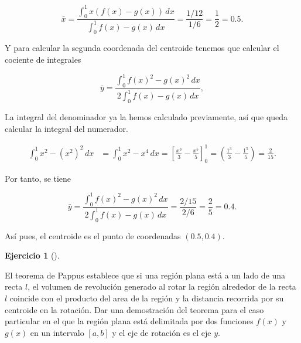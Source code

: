 \documentclass[
  spanish,
  a4paper,
]{scrreport}
\theoremstyle{definition}
\newtheorem{exercise}{Ejercicio}[chapter]
\theoremstyle{remark}
\begin{document}
\begin{tcolorbox}
\[
\bar x = \frac{\int_0^1 x (f(x)-g(x))\,dx}{\int_0^1f(x)-g(x)\,dx}
= \frac{1/12}{1/6}
= \frac{1}{2}
= 0.5.
\]

Y para calcular la segunda coordenada del centroide tenemos que calcular
el cociente de integrales

\[
\bar y = \frac{\int_0^1 f(x)^2-g(x)^2\,dx}{2\int_0^1f(x)-g(x)\,dx}, 
\]

La integral del denominador ya la hemos calculado previamente, así que
queda calcular la integral del numerador.

\begin{align*}
\int_0^1 x^2 - (x^2)^2\,dx
&= \int_0^1 x^2-x^4\,dx
= \left[\frac{x^3}{3}-\frac{x^5}{5}\right]_0^1
= \left(\frac{1^3}{3}-\frac{1^5}{5}\right)
= \frac{2}{15}.
\end{align*}

Por tanto, se tiene

\[
\bar y = \frac{\int_0^1 f(x)^2-g(x)^2\,dx}{2\int_0^1f(x)-g(x)\,dx}
= \frac{2/15}{2/6} 
= \frac{2}{5}
= 0.4.
\]

Así pues, el centroide es el punto de coordenadas \((0.5, 0.4)\).

\end{tcolorbox}

\begin{exercise}[]\protect\hypertarget{exr-teorema-pappus}{}\label{exr-teorema-pappus}

El teorema de Pappus establece que si una región plana está a un lado de
una recta \(l\), el volumen de revolución generado al rotar la región
alrededor de la recta \(l\) coincide con el producto del area de la
región y la distancia recorrida por su centroide en la rotación. Dar una
demostración del teorema para el caso particular en el que la región
plana está delimitada por dos funciones \(f(x)\) y \(g(x)\) en un
intervalo \([a,b]\) y el eje de rotación es el eje \(y\).

\end{exercise}
\end{document}
